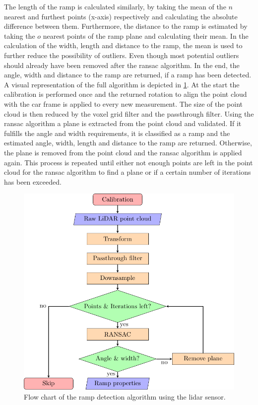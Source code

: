 The length of the ramp is calculated similarly, by taking the mean of the $n$ nearest and furthest points (x-axis) respectively and calculating the absolute difference between them.
Furthermore, the distance to the ramp is estimated by taking the $o$ nearest points of the ramp plane and calculating their mean.
In the calculation of the width, length and distance to the ramp, the mean is used to further reduce the possibility of outliers.
Even though most potential outliers should already have been removed after the \gls{ransac} algorithm.
In the end, the angle, width and distance to the ramp are returned, if a ramp has been detected.\\
A visual representation of the full algorithm is depicted in \cref{fig:flowchart_lidar}.
At the start the calibration is performed once and the returned rotation to align the point cloud with the car frame is applied to every new measurement.
The size of the point cloud is then reduced by the voxel grid filter and the passthrough filter.
Using the \gls{ransac} algorithm a plane is extracted from the point cloud and validated.
If it fulfills the angle and width requirements, it is classified as a ramp and the estimated angle, width, length and distance to the ramp are returned.
Otherwise, the plane is removed from the point cloud and the \gls{ransac} algorithm is applied again.
This process is repeated until either not enough points are left in the point cloud for the \gls{ransac} algorithm to find a plane or if a certain number of iterations has been exceeded.
\begin{figure}[htb]
	\centering
	\includegraphics{Graphics/TikZ/flowchart_lidar.pdf}
	\caption[Flow chart of the  algorithm]{Flow chart of the ramp detection algorithm using the \acrshort{lidar} sensor.}
	\label{fig:flowchart_lidar}
\end{figure}



